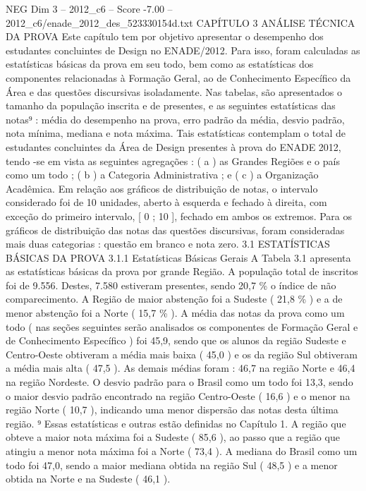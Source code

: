 \begin{textsample}{NEG Dim 3 – 2012\_c6 – Score -7.00 – 2012\_c6/enade\_2012\_des\_523330154d.txt}  \label{ex:f3_neg_027}
CAPÍTULO 3 ANÁLISE TÉCNICA DA PROVA Este capítulo tem por objetivo apresentar o desempenho dos estudantes concluintes de Design no ENADE/2012.
Para isso, foram calculadas as estatísticas básicas da prova em seu todo, bem como as estatísticas dos componentes relacionadas à Formação Geral, ao de Conhecimento Específico da Área e das questões discursivas isoladamente.
Nas tabelas, são apresentados o tamanho da população inscrita e de presentes, e as seguintes estatísticas das notas⁹ : média do desempenho na prova, erro padrão da média, desvio padrão, nota mínima, mediana e nota máxima.
Tais estatísticas contemplam o total de estudantes concluintes da Área de Design presentes à prova do ENADE 2012, tendo -se em vista as seguintes agregações : ( a ) as Grandes Regiões e o país como um todo ; ( b ) a Categoria Administrativa ; e ( c ) a Organização Acadêmica.
Em relação aos gráficos de distribuição de notas, o intervalo considerado foi de 10 unidades, aberto à esquerda e fechado à direita, com exceção do primeiro intervalo, [ 0 ; 10 ], fechado em ambos os extremos.
Para os gráficos de distribuição das notas das questões discursivas, foram consideradas mais duas categorias : questão em branco e nota zero. 3.1 ESTATÍSTICAS BÁSICAS DA PROVA 3.1.1 Estatísticas Básicas Gerais A Tabela 3.1 apresenta as estatísticas básicas da prova por grande Região.
A população total de inscritos foi de 9.556.
Destes, 7.580 estiveram presentes, sendo 20,7 \% o índice de não comparecimento.
A Região de maior abstenção foi a Sudeste ( 21,8 \% ) e a de menor abstenção foi a Norte ( 15,7 \% ).
A média das notas da prova como um todo ( nas seções seguintes serão analisados os componentes de Formação Geral e de Conhecimento Específico ) foi 45,9, sendo que os alunos da região Sudeste e Centro-Oeste obtiveram a média mais baixa ( 45,0 ) e os da região Sul obtiveram a média mais alta ( 47,5 ).
As demais médias foram : 46,7 na região Norte e 46,4 na região Nordeste.
O desvio padrão para o Brasil como um todo foi 13,3, sendo o maior desvio padrão encontrado na região Centro-Oeste ( 16,6 ) e o menor na região Norte ( 10,7 ), indicando uma menor dispersão das notas desta última região. ⁹ Essas estatísticas e outras estão definidas no Capítulo 1.
A região que obteve a maior nota máxima foi a Sudeste ( 85,6 ), ao passo que a região que atingiu a menor nota máxima foi a Norte ( 73,4 ).
A mediana do Brasil como um todo foi 47,0, sendo a maior mediana obtida na região Sul ( 48,5 ) e a menor obtida na Norte e na Sudeste ( 46,1 ).

\end{textsample}
